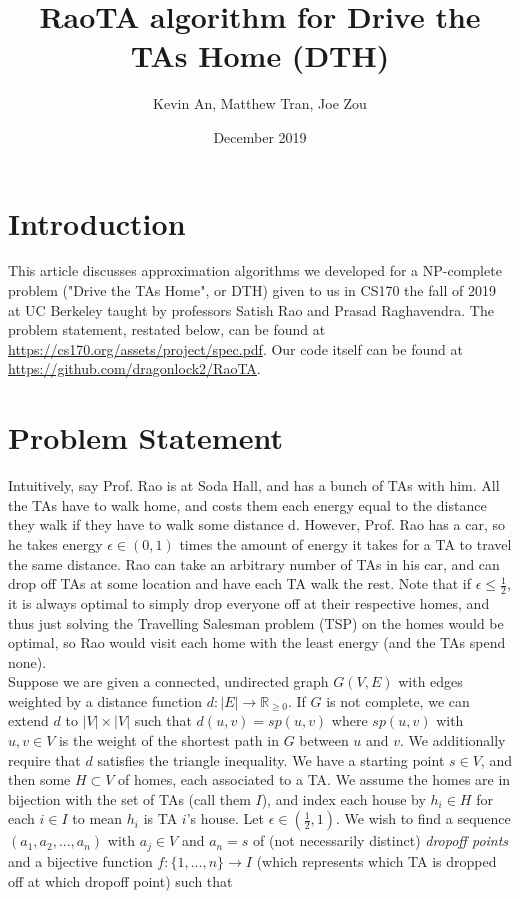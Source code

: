 \documentclass{article}
\title{RaoTA algorithm for Drive the TAs Home (DTH)}
\author{Kevin An, Matthew Tran, Joe Zou}
\date{December 2019}
\theoremstyle{definition}
\theoremstyle{remark}
\begin{document}
\maketitle
\pagebreak
\section{Introduction}
    This article discusses approximation algorithms we developed for a NP-complete problem ("Drive the TAs Home", or DTH) given to us in CS170 the fall of 2019 at UC Berkeley taught by professors Satish Rao and Prasad Raghavendra. The problem statement, restated below, can be found at \url{https://cs170.org/assets/project/spec.pdf}. Our code itself can be found at \url{https://github.com/dragonlock2/RaoTA}.
    
\section{Problem Statement}
    	Intuitively, say Prof. Rao is at Soda Hall, and has a bunch of TAs with him. All the TAs have to walk home, and costs them each energy equal to the distance they walk if they have to walk some distance d. However, Prof. Rao has a car, so he takes energy $\epsilon \in (0, 1)$ times the amount of energy it takes for a TA to travel the same distance. Rao can take an arbitrary number of TAs in his car, and can drop off TAs at some location and have each TA walk the rest. Note that if $\epsilon \leq \frac{1}{2}$, it is always optimal to simply drop everyone off at their respective homes, and thus just solving the Travelling Salesman problem (TSP) on the homes would be optimal, so Rao would visit each home with the least energy (and the TAs spend none). 
        \\
        
        Suppose we are given a connected, undirected graph $G(V, E)$ with edges weighted by a distance function $d: |E| \xrightarrow{} \mathbb{R}_{\geq 0}$. If $G$ is not complete, we can extend $d$ to $|V| \times |V|$ such that $d(u, v) = sp(u, v)$ where $sp(u, v)$ with $u, v \in V$ is the weight of the shortest path in $G$ between $u$ and $v$.  We additionally require that $d$ satisfies the triangle inequality. We have a starting point $s \in V$, and then some $H \subset V$ of homes, each associated to a TA.  We assume the homes are in bijection with the set of TAs (call them $I$), and index each house by $h_i \in H$ for each $i \in I$ to mean $h_i$ is TA $i$'s house. Let $\epsilon \in (\frac{1}{2}, 1)$. We wish to find a sequence $(a_1, a_2, ..., a_n)$ with $a_j \in V$ and $a_n = s$ of (not necessarily distinct) \textit{dropoff points} and a bijective function $f: \{1, ..., n\} \rightarrow I$ (which represents which TA is dropped off at which dropoff point) such that
        
\end{document}
